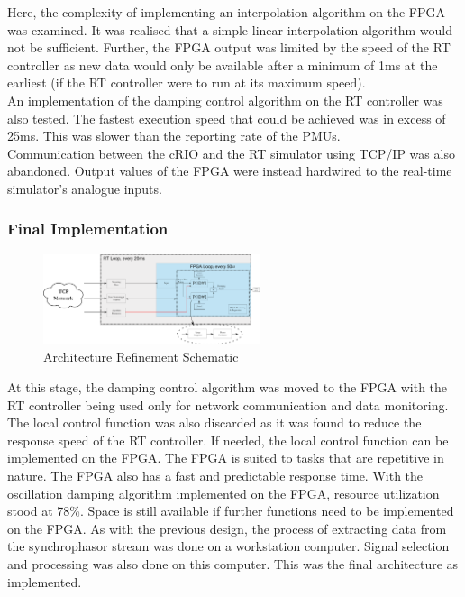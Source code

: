 \documentclass[conference]{IEEEtran}
\begin{document}
Here, the complexity of implementing an interpolation algorithm on the FPGA was examined. It was realised that a simple linear interpolation algorithm would not be sufficient. Further, the FPGA output was limited by the speed of the RT controller as new data would only be available after a minimum of 1ms at the earliest (if the RT controller were to run at its maximum speed).\\

An implementation of the damping control algorithm on the RT controller was also tested. The fastest execution speed that could be achieved was in excess of 25ms. This was slower than the reporting rate of the PMUs.\\

Communication between the cRIO and the RT simulator using TCP/IP was also abandoned. Output values of the FPGA were instead hardwired to the real-time simulator's analogue inputs.\\

\subsubsection{Final Implementation}


\begin{figure}[!ht]
\centering
\includegraphics[width=2.5in]{ControllerArch.png} 
\caption{Architecture Refinement Schematic}
\label{RTControllerArch}
\end{figure}

At this stage, the damping control algorithm was moved to the FPGA with the RT controller being used only for network communication and data monitoring. The local control function was also discarded as it was found to reduce the response speed of the RT  controller. If needed, the local control function can be implemented on the FPGA. The FPGA is suited to tasks that are repetitive in nature. The FPGA also has a fast and predictable response time. With the oscillation damping algorithm implemented on the FPGA, resource utilization stood at 78\%. Space is still available if further functions need to be implemented on the FPGA. As with the previous design, the process of extracting data from the synchrophasor stream was done on a workstation computer. Signal selection and processing was also done on this computer. This was the final architecture as implemented.\\
\end{document}
